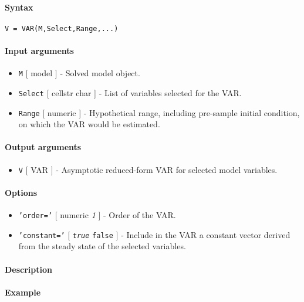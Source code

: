 


	\paragraph{Syntax}\label{syntax}

\begin{verbatim}
V = VAR(M,Select,Range,...)
\end{verbatim}

\paragraph{Input arguments}\label{input-arguments}

\begin{itemize}
\item
  \texttt{M} {[} model {]} - Solved model object.
\item
  \texttt{Select} {[} cellstr \textbar{} char {]} - List of variables
  selected for the VAR.
\item
  \texttt{Range} {[} numeric {]} - Hypothetical range, including
  pre-sample initial condition, on which the VAR would be estimated.
\end{itemize}

\paragraph{Output arguments}\label{output-arguments}

\begin{itemize}
\itemsep1pt\parskip0pt
\item
  \texttt{V} {[} VAR {]} - Asymptotic reduced-form VAR for selected
  model variables.
\end{itemize}

\paragraph{Options}\label{options}

\begin{itemize}
\item
  \texttt{'order='} {[} numeric \textbar{} \emph{1} {]} - Order of the
  VAR.
\item
  \texttt{'constant='} {[} \emph{\texttt{true}} \textbar{}
  \texttt{false} {]} - Include in the VAR a constant vector derived from
  the steady state of the selected variables.
\end{itemize}

\paragraph{Description}\label{description}

\paragraph{Example}\label{example}



